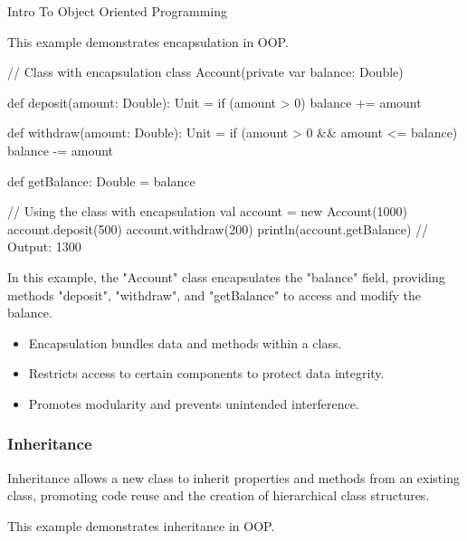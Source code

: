 \begin{notes}{Intro To Object Oriented Programming}
    \begin{highlight}[Encapsulation]
    
        This example demonstrates encapsulation in OOP.
    
    \begin{code}[Scala]
    // Class with encapsulation
    class Account(private var balance: Double) {
        def deposit(amount: Double): Unit = {
            if (amount > 0) balance += amount
        }
    
        def withdraw(amount: Double): Unit = {
            if (amount > 0 && amount <= balance) balance -= amount
        }
    
        def getBalance: Double = balance
    }
    
    // Using the class with encapsulation
    val account = new Account(1000)
    account.deposit(500)
    account.withdraw(200)
    println(account.getBalance)  // Output: 1300
    \end{code}
    
        In this example, the "Account" class encapsulates the "balance" field, providing methods "deposit", "withdraw", and "getBalance" to access and modify the balance.
    
        \begin{itemize}
            \item Encapsulation bundles data and methods within a class.
            \item Restricts access to certain components to protect data integrity.
            \item Promotes modularity and prevents unintended interference.
        \end{itemize}
    
    \end{highlight}
    
    \subsubsection*{Inheritance}
    
    Inheritance allows a new class to inherit properties and methods from an existing class, promoting code reuse and the creation of hierarchical class structures.
    
    \begin{highlight}[Inheritance]
    
        This example demonstrates inheritance in OOP.
    
\end{highlight}
\end{notes}
